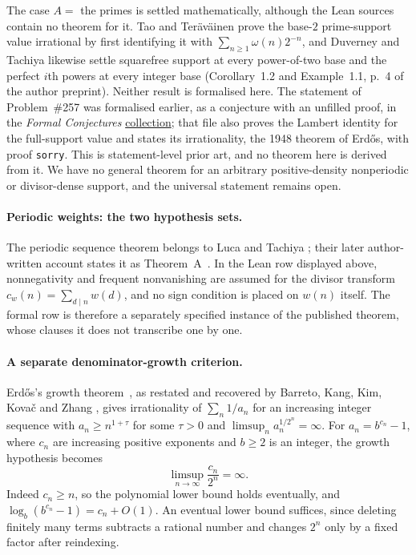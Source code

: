 \begin{rem}
The case $A=$ the primes is settled mathematically, although the Lean
sources contain no theorem for it. Tao and Ter\"av\"ainen prove the
base-$2$ prime-support value irrational by first identifying it with
$\sum_{n\ge1}\omega(n)2^{-n}$, and Duverney and Tachiya likewise settle
squarefree support at every power-of-two base and the perfect $i$th
powers at every integer base (Corollary~1.2 and Example~1.1, p.~4 of the
author preprint). Neither result is formalised here. The statement of
Problem~\#257 was formalised earlier, as a conjecture with an unfilled
proof, in the \emph{Formal Conjectures}
\href{https://github.com/google-deepmind/formal-conjectures/blob/f776d2f2039351b00737ffcafb9d7d7666e1d9af/FormalConjectures/ErdosProblems/257.lean}{collection};
that file also proves the Lambert identity for the full-support value and
states its irrationality, the 1948 theorem of Erd\H{o}s, with proof
\texttt{sorry}. This is statement-level prior art, and no theorem here is
derived from it. We have no general theorem for an arbitrary
positive-density nonperiodic or divisor-dense support, and the universal
statement remains open.
\end{rem}

\paragraph{Periodic weights: the two hypothesis sets.}
The periodic sequence theorem belongs to Luca and Tachiya
\cite{lucatachiya2014periodic}; their later author-written account states
it as Theorem~A~\cite[p.~139]{lucatachiya2017}. In the Lean row displayed
above, nonnegativity and frequent nonvanishing are assumed for the divisor
transform $c_w(n)=\sum_{d\mid n}w(d)$, and no sign condition is placed on
$w(n)$ itself. The formal row is therefore a separately specified instance
of the published theorem, whose clauses it does not transcribe one by
one.

\paragraph{A separate denominator-growth criterion.}
Erd\H{o}s's growth theorem~\cite{erdos1975}, as restated and recovered
by Barreto, Kang, Kim, Kova\v{c} and Zhang
\cite[Remark~4(4), p.~5]{bkkkz2026}, gives irrationality of
$\sum_n1/a_n$ for an increasing integer sequence with
$a_n\ge n^{1+\tau}$ for some $\tau>0$ and
$\limsup_n a_n^{1/2^n}=\infty$.  For $a_n=b^{c_n}-1$, where
$c_n$ are increasing positive exponents and $b\ge2$ is an integer,
the growth hypothesis becomes
\[
 \limsup_{n\to\infty}\frac{c_n}{2^n}=\infty.
\]
Indeed $c_n\ge n$, so the polynomial lower bound holds eventually,
and $\log_b(b^{c_n}-1)=c_n+O(1)$. An eventual lower bound suffices,
since deleting finitely many terms subtracts a rational number and changes
$2^n$ only by a fixed factor after reindexing.

